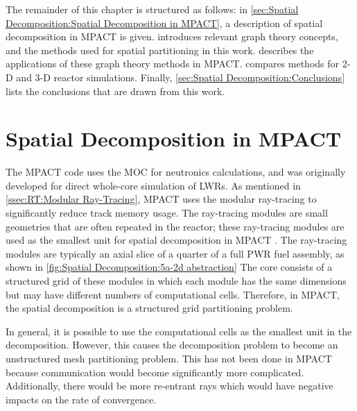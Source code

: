 {{    The remainder of this chapter is structured as follows:
    in \cref{sec:Spatial Decomposition:Spatial Decomposition in MPACT}, a description of spatial decomposition in MPACT is given.
     introduces relevant graph theory concepts, and the methods used for spatial partitioning in this work.
     describes the applications of these graph theory methods in MPACT.
     compares methods for 2-D and 3-D reactor simulations.
    Finally, \cref{sec:Spatial Decomposition:Conclusions} lists the conclusions that are drawn from this work.
  }
  \section{Spatial Decomposition in MPACT}{\label{sec:Spatial Decomposition:Spatial Decomposition in MPACT}
    The MPACT code uses the \ac{MOC} for neutronics calculations, and was originally developed for direct whole-core simulation of \acp{LWR}.
    As mentioned in \cref{ssec:RT:Modular Ray-Tracing}, MPACT uses the modular ray-tracing \cite{Saji2000} to significantly reduce track memory usage.
    The ray-tracing modules are small geometries that are often repeated in the reactor; these ray-tracing modules are used as the smallest unit for spatial decomposition in MPACT \cite{StimpsonPartitioning2017}.
    The ray-tracing modules are typically an axial slice of a quarter of a full \ac{PWR} fuel assembly, as shown in \cref{fig:Spatial Decomposition:5a-2d abstraction}
    The core consists of a structured grid of these modules in which each module has the same dimensions but may have different numbers of computational cells.
    Therefore, in MPACT, the spatial decomposition is a structured grid partitioning problem.

    In general, it is possible to use the computational cells as the smallest unit in the decomposition.
    However, this causes the decomposition problem to become an unstructured mesh partitioning problem.
    This has not been done in MPACT because communication would become significantly more complicated.
    Additionally, there would be more re-entrant rays which would have negative impacts on the rate of convergence.

}}
